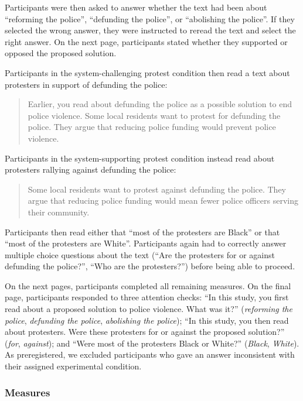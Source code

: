 \documentclass[twocolumn, 11pt, letterpaper]{article}
\begin{document}
\noindent Participants were then asked to answer whether the text had
been about ``reforming the police'', ``defunding the police'', or
``abolishing the police''. If they selected the wrong answer, they were
instructed to reread the text and select the right answer. On the next
page, participants stated whether they supported or opposed the proposed
solution.

Participants in the system-challenging protest condition then read a
text about protesters in support of defunding the police:

\begin{quote}
Earlier, you read about defunding the police as a possible solution to
end police violence. Some local residents want to protest for defunding
the police. They argue that reducing police funding would prevent police
violence.
\end{quote}

\noindent Participants in the system-supporting protest condition
instead read about protesters rallying against defunding the police:

\begin{quote}
Some local residents want to protest against defunding the police. They
argue that reducing police funding would mean fewer police officers
serving their community.
\end{quote}

\noindent Participants then read either that ``most of the protesters
are Black'' or that ``most of the protesters are White''. Participants
again had to correctly answer multiple choice questions about the text
(``Are the protesters for or against defunding the police?'', ``Who are
the protesters?'') before being able to proceed.

On the next pages, participants completed all remaining measures. On the
final page, participants responded to three attention checks: ``In this
study, you first read about a proposed solution to police violence. What
was it?'' (\emph{reforming the police}, \emph{defunding the police},
\emph{abolishing the police}); ``In this study, you then read about
protesters. Were these protesters for or against the proposed
solution?'' (\emph{for}, \emph{against}); and ``Were most of the
protesters Black or White?'' (\emph{Black}, \emph{White}). As
preregistered, we excluded participants who gave an answer inconsistent
with their assigned experimental condition.

\hypertarget{measures-1}{%
\subsubsection{Measures}\label{measures-1}}
\end{document}
